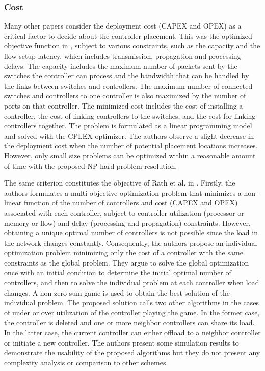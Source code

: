 \documentclass{IEEEtran}
\begin{document}
\subsubsection{Cost}
Many other papers consider the deployment cost (CAPEX and OPEX) as a critical factor to decide about the controller placement. This was the optimized objective function in \cite{SaSt15}, subject to various constraints, such as the capacity and the flow-setup latency, which includes transmission, propagation and processing delays. The capacity includes the maximum number of packets sent by the switches the controller can process and the bandwidth that can be handled by the links between switches and controllers. The maximum number of connected switches and controllers to one controller is also maximized by the number of ports on that controller. The minimized cost includes the cost of installing a controller, the cost of linking controllers to the switches, and the cost for linking controllers together. The problem is formulated as a linear programming model and solved with the CPLEX optimizer. The authors observe a slight decrease in the deployment cost when the number of potential placement locations increases. However, only small size problems can be optimized within a reasonable amount of time with the proposed NP-hard problem resolution. 

The same criterion constitutes the objective of Rath et al. in \cite{RaRe14}. Firstly, the authors formulates a multi-objective optimization problem that minimizes a non-linear function of the number of controllers and cost (CAPEX and OPEX) associated with each controller, subject to controller utilization (processor or memory or flow) and delay (processing and propagation) constraints. However, obtaining a unique optimal number of controllers is not possible since the load in the network changes constantly. Consequently, the authors propose an individual optimization problem minimizing only the cost of a controller with the same constraints as the global problem. They argue to solve the global optimization once with an initial condition to determine the initial optimal number of controllers, and then to solve the individual problem at each controller when load changes. A non-zero-sum game is used to obtain the best solution of the individual problem. The proposed solution calls two other algorithms in the cases of under or over utilization of the controller playing the game. In the former case, the controller is deleted and one or more neighbor controllers can share its load. In the latter case, the current controller can either offload to a neighbor controller or initiate a new controller. The authors present some simulation results to demonstrate the usability of the proposed algorithms but they do not present any complexity analysis or comparison to other schemes.
\end{document}
